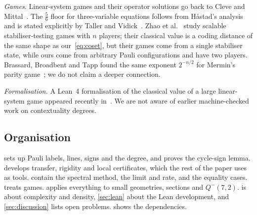 \documentclass[a4paper,onecolumn,11pt,unpublished,nopdfoutputerror]{quantumarticle}
\theoremstyle{definition}
\newcommand{\Qm}[1]{Q^{-}(#1,2)}
\begin{document}
\emph{Games.} Linear-system games and their operator solutions go back to Cleve and
Mittal~\cite{CleveMittal2014,CleveLiuSlofstra2017,Slofstra2019}. The $\tfrac56$ floor for three-variable equations
follows from H\aa stad's analysis~\cite{Hastad2001} and is stated explicitly by Taller and
Vidick~\cite{TallerVidick2025}. Zhao et al.~\cite{ZhaoEtAl2025} study scalable stabiliser-testing games with
$n$ players; their classical value is a coding distance of the same shape as our~\eqref{eq:coset}, but their games
come from a single stabiliser state, while ours come from arbitrary Pauli configurations and have two players.
Brassard, Broadbent and Tapp found the same exponent $2^{-n/2}$ for Mermin's parity game~\cite{BBT2005}; we do not
claim a deeper connection.

\emph{Formalisation.} A Lean~4 formalisation of the classical value of a large linear-system game appeared
recently in~\cite{TsirelsonLean2026}. We are not aware of earlier machine-checked work on contextuality degrees.

\subsection{Organisation}

 sets up Pauli labels, lines, signs and the degree, and proves the cycle-sign lemma.
 develops transfer, rigidity and local certificates, which the rest of the paper uses as tools.
 contain the spectral method, the limit and rate, and the equality
cases.  treats games.  applies everything to small geometries, sections and
$\Qm7$.  is about complexity and density, \cref{sec:lean} about the Lean development, and
\cref{sec:discussion} lists open problems.  shows the dependencies.
\end{document}
